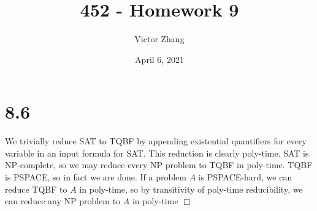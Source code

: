 \documentclass{article}
\title{452 - Homework 9}
\author{Victor Zhang}
\date{April 6, 2021}
\begin{document}
\maketitle

\section*{8.6}
We trivially reduce SAT to TQBF by appending existential quantifiers for every variable in an input formula for SAT. This reduction is clearly poly-time. SAT is NP-complete, so we may reduce every NP problem to TQBF in poly-time. TQBF is PSPACE, so in fact we are done. If a problem $A$ is PSPACE-hard, we can reduce TQBF to $A$ in poly-time, so by transitivity of poly-time reducibility, we can reduce any NP problem to $A$ in poly-time $\Box$
\end{document}
